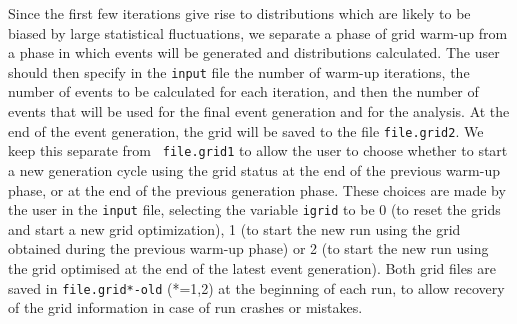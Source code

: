 \documentclass[paper]{JHEP3}
\begin{document}
\begin{appendix}
\begin{itemize}
         Since the first few
         iterations give rise to distributions which are likely to be
         biased by large statistical fluctuations, we separate a phase
         of grid warm-up from a phase in which events will be
         generated and distributions calculated. The user should then
         specify in the {\tt input} file the number of warm-up
         iterations, the number of events to be calculated for each
         iteration, and then the number of events that will be used
         for the final event generation and for the analysis. At the
         end of the event generation, the grid will be saved to the
         file {\tt file.grid2}. We keep this separate from {\tt
           file.grid1} to allow the user to choose whether to start a
         new generation cycle
         using the grid status at the end of the previous warm-up
         phase, or at the end of the previous generation phase.
         These choices are made by the user in the {\tt input} file,
         selecting the variable {\tt igrid} to be 0 (to reset the
         grids and start a new grid optimization), 1 (to start the new
         run using the grid obtained during the previous warm-up
         phase) or 2 (to start the new run using the grid optimised at
         the end of the latest event generation). Both grid files are
         saved in {\tt file.grid*-old} (*=1,2) at the beginning
         of each run, to allow recovery of the grid information in
         case of run crashes or mistakes.
\end{itemize}

\end{appendix}
\end{document}
